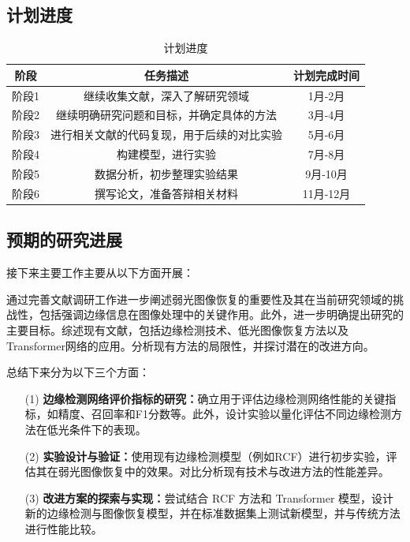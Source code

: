 \documentclass[a4paper]{ctexart}
\begin{document}
	\subsection{计划进度}

	\begin{table}[!htbp]
		\centering
			\begin{tabular}{ccc}
				\toprule
				阶段  & 任务描述                                                & 计划完成时间 \\
				\midrule
				阶段1 & 继续收集文献，深入了解研究领域        	                 & 1月-2月     \\
				阶段2 & 继续明确研究问题和目标，并确定具体的方法                   & 3月-4月     \\
				阶段3 & 进行相关文献的代码复现，用于后续的对比实验                 & 5月-6月     \\
				阶段4 & 构建模型，进行实验                                       & 7月-8月     \\
				阶段5 & 数据分析，初步整理实验结果                                & 9月-10月    \\
				阶段6 & 撰写论文，准备答辩相关材料                                & 11月-12月   \\
				\bottomrule
			\end{tabular}
		\caption{
			\label{tab: Schedule}
			计划进度
		} 
	\end{table}
	
	\subsection{预期的研究进展}
	
	接下来主要工作主要从以下方面开展：
	
	通过完善文献调研工作进一步阐述弱光图像恢复的重要性及其在当前研究领域的挑战性，包括强调边缘信息在图像处理中的关键作用。此外，进一步明确提出研究的主要目标。综述现有文献，包括边缘检测技术、低光图像恢复方法以及Transformer网络的应用。分析现有方法的局限性，并探讨潜在的改进方向。
	
	总结下来分为以下三个方面：
	\begin{itemize}
		\item[(1)] \textbf{边缘检测网络评价指标的研究：}确立用于评估边缘检测网络性能的关键指标，如精度、召回率和F1分数等。此外，设计实验以量化评估不同边缘检测方法在低光条件下的表现。
		
		\item[(2)] \textbf{实验设计与验证：}使用现有边缘检测模型（例如RCF）进行初步实验，评估其在弱光图像恢复中的效果。对比分析现有技术与改进方法的性能差异。
		
		\item[(3)] \textbf{改进方案的探索与实现：}尝试结合 RCF 方法和 Transformer 模型，设计新的边缘检测与图像恢复模型，并在标准数据集上测试新模型，并与传统方法进行性能比较。
	\end{itemize}
	
\end{document}
